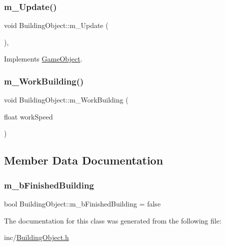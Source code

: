 \mbox{\label{class_building_object_a35fc31e0f1c9a1323b7dfedc527fccff}} 
\subsubsection{\texorpdfstring{m\+\_\+\+Update()}{m\_Update()}}
{\footnotesize\ttfamily void Building\+Object\+::m\+\_\+\+Update (\begin{DoxyParamCaption}{ }\end{DoxyParamCaption})\hspace{0.3cm}{\ttfamily [override]}, {\ttfamily [virtual]}}



Implements \mbox{\hyperlink{class_game_object_a3af5a7b470e09f13a1422439fc6a9ba8}{Game\+Object}}.

\mbox{\label{class_building_object_a3fd4003a55d98f537edfb002fc3726c1}} 
\subsubsection{\texorpdfstring{m\+\_\+\+Work\+Building()}{m\_WorkBuilding()}}
{\footnotesize\ttfamily void Building\+Object\+::m\+\_\+\+Work\+Building (\begin{DoxyParamCaption}\item[{float}]{work\+Speed }\end{DoxyParamCaption})}



\subsection{Member Data Documentation}
\mbox{\label{class_building_object_a2dd2d1f12b504e16b3bce3e8825badb7}} 
\subsubsection{\texorpdfstring{m\+\_\+b\+Finished\+Building}{m\_bFinishedBuilding}}
{\footnotesize\ttfamily bool Building\+Object\+::m\+\_\+b\+Finished\+Building = false}



The documentation for this class was generated from the following file\+:\begin{DoxyCompactItemize}
\item 
inc/\mbox{\hyperlink{_building_object_8h}{Building\+Object.\+h}}\end{DoxyCompactItemize}

